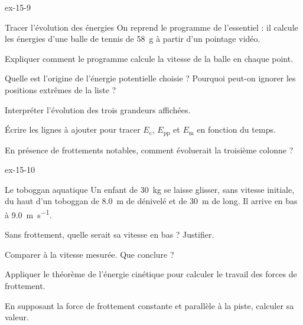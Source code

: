 \begin{blocLivre}{ex-15-9}
\begin{exercice}[2]{Tracer l'évolution des énergies}
On reprend le programme de l'essentiel : il calcule les énergies d'une balle de tennis de 58~g à partir d'un pointage
vidéo.
\begin{questions}
\item {}Expliquer comment le programme calcule la vitesse de la balle en chaque point.
\item Quelle est l'origine de l'énergie potentielle choisie ? Pourquoi peut-on ignorer les positions extrêmes de la
liste ?
\item Interpréter l'évolution des trois grandeurs affichées.
\item Écrire les lignes à ajouter pour tracer $E_\mathrm{c}$, $E_\mathrm{pp}$ et $E_\mathrm{m}$ en fonction du temps.
\item En présence de frottements notables, comment évoluerait la troisième colonne ?
\end{questions}
\end{exercice}
\end{blocLivre}
\begin{blocLivre}{ex-15-10}
\begin{exercice}[2]{Le toboggan aquatique}
Un enfant de 30~kg se laisse glisser, sans vitesse initiale, du haut d'un toboggan de \qty{8,0}{m} de dénivelé et de
\qty{30}{m} de long. Il arrive en bas à \qty{9,0}{m.s^{-1}}.
\begin{questions}
\item Sans frottement, quelle serait sa vitesse en bas ? Justifier.
\item Comparer à la vitesse mesurée. Que conclure ?
\item Appliquer le théorème de l'énergie cinétique pour calculer le travail des forces de frottement.
\item En supposant la force de frottement constante et parallèle à la piste, calculer sa valeur.
\end{questions}
\end{exercice}
\end{blocLivre}
